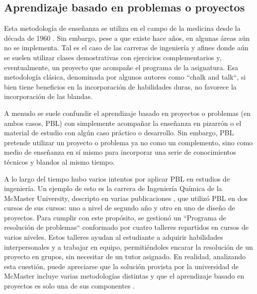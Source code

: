 \documentclass[conference]{IEEEtran}
\begin{document}



\subsection{Aprendizaje basado en problemas o proyectos}
\label{scrivauto:16}

Esta metodología de enseñanza se utiliza en el campo de la medicina desde la década de 1960 \cite{b12}. Sin embargo, pese a que existe hace años, en algunas áreas aún no se implementa. Tal es el caso de las carreras de ingeniería y afines donde aún se suelen utilizar clases demostrativas con ejercicios complementarios y, eventualmente, un proyecto que acompañe el programa de la asignatura. Esa metodología clásica, denominada por algunos autores como ``chalk and talk``, si bien tiene beneficios en la incorporación de habilidades duras, no favorece la incorporación de las blandas.

A menudo se suele confundir el aprendizaje basado en proyectos o problemas (en ambos casos, PBL) con simplemente acompañar la enseñanza en pizarrón o el material de estudio con algún caso práctico o desarrollo. Sin embargo, PBL pretende utilizar un proyecto o problema ya no como un complemento, sino como medio de enseñanza en sí mismo para incorporar una serie de conocimientos técnicos y blandos al mismo tiempo.

A lo largo del tiempo hubo varios intentos por aplicar PBL en estudios de ingeniería. Un ejemplo de esto es la carrera de Ingeniería Química de la McMaster University, descripto en varias publicaciones \cite{b12}, que utilizó PBL en dos cursos de sus cursos: uno a nivel de segundo año y otro en uno de diseño de proyectos. Para cumplir con este propósito, se gestionó un ``Programa de resolución de problemas`` conformado por cuatro talleres repartidos en cursos de varios niveles. Estos talleres ayudan al estudiante a adquirir habilidades interpersonales y a trabajar en equipo, permitiéndoles encarar la resolución de un proyecto en grupos, sin necesitar de un tutor asignado. En realidad, analizando esta cuestión, puede apreciarse que la solución provista por la universidad de McMaster incluye varias metodologías distintas y que el aprendizaje basado en proyectos es solo una de sus componentes \cite{b12}.
\end{document}
